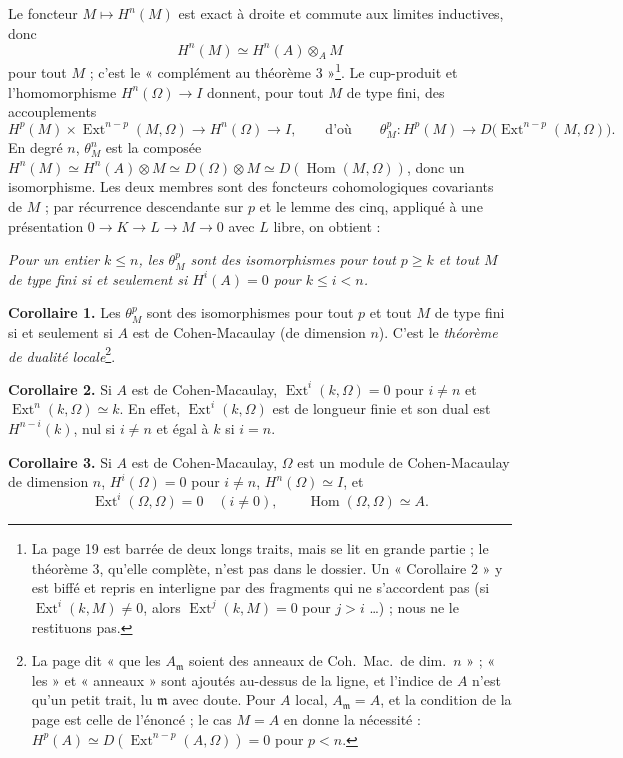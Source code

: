\documentclass[11pt,a4paper]{article}
\begin{document}
Le foncteur $M \mapsto H^n(M)$ est exact à droite et commute aux limites
inductives, donc
\[
  H^n(M) \simeq H^n(A) \otimes_A M
\]
pour tout $M$ ; c'est le « complément au théorème 3 »\footnote{La page 19 est
barrée de deux longs traits, mais se lit en grande partie ; le théorème 3,
qu'elle complète, n'est pas dans le dossier. Un « Corollaire 2 » y est biffé
et repris en interligne par des fragments qui ne s'accordent pas (si
$\operatorname{Ext}^i(k, M) \neq 0$, alors $\operatorname{Ext}^j(k, M) = 0$
pour $j > i$ …) ; nous ne le restituons pas.}. Le cup-produit et
l'homomorphisme $H^n(\Omega) \to I$ donnent, pour tout $M$ de type fini, des
accouplements
\[
  H^p(M) \times \operatorname{Ext}^{n-p}(M, \Omega) \to H^n(\Omega) \to I,
  \qquad\text{d'où}\qquad
  \theta^p_M : H^p(M) \longrightarrow D\bigl(\operatorname{Ext}^{n-p}(M, \Omega)\bigr).
\]
En degré $n$, $\theta^n_M$ est la composée $H^n(M) \simeq H^n(A) \otimes M
\simeq D(\Omega) \otimes M \simeq D(\operatorname{Hom}(M, \Omega))$, donc un
isomorphisme. Les deux membres sont des foncteurs cohomologiques covariants de
$M$ ; par récurrence descendante sur $p$ et le lemme des cinq, appliqué à une
présentation $0 \to K \to L \to M \to 0$ avec $L$ libre, on obtient :

\emph{Pour un entier $k \leqslant n$, les $\theta^p_M$ sont des isomorphismes
pour tout $p \geqslant k$ et tout $M$ de type fini si et seulement si $H^i(A) =
0$ pour $k \leqslant i < n$.}

\textbf{Corollaire 1.} Les $\theta^p_M$ sont des isomorphismes pour tout $p$ et
tout $M$ de type fini si et seulement si $A$ est de Cohen-Macaulay (de
dimension $n$). C'est le \emph{théorème de dualité locale}\footnote{La page dit
« que les $A_{\mathfrak{m}}$ soient des anneaux de Coh.\ Mac.\ de dim.\ $n$ » ;
« les » et « anneaux » sont ajoutés au-dessus de la ligne, et l'indice de $A$
n'est qu'un petit trait, lu $\mathfrak{m}$ avec doute. Pour $A$ local,
$A_{\mathfrak{m}} = A$, et la condition de la page est celle de l'énoncé ;
le cas $M = A$ en donne la nécessité : $H^p(A) \simeq
D(\operatorname{Ext}^{n-p}(A, \Omega)) = 0$ pour $p < n$.}.

\textbf{Corollaire 2.} Si $A$ est de Cohen-Macaulay, $\operatorname{Ext}^i(k,
\Omega) = 0$ pour $i \neq n$ et $\operatorname{Ext}^n(k, \Omega) \simeq k$. En
effet, $\operatorname{Ext}^i(k, \Omega)$ est de longueur finie et son dual est
$H^{n-i}(k)$, nul si $i \neq n$ et égal à $k$ si $i = n$.

\textbf{Corollaire 3.} Si $A$ est de Cohen-Macaulay, $\Omega$ est un module de
Cohen-Macaulay de dimension $n$, $H^i(\Omega) = 0$ pour $i \neq n$,
$H^n(\Omega) \simeq I$, et
\[
  \operatorname{Ext}^i(\Omega, \Omega) = 0 \quad (i \neq 0), \qquad
  \operatorname{Hom}(\Omega, \Omega) \simeq A.
\]
\end{document}
